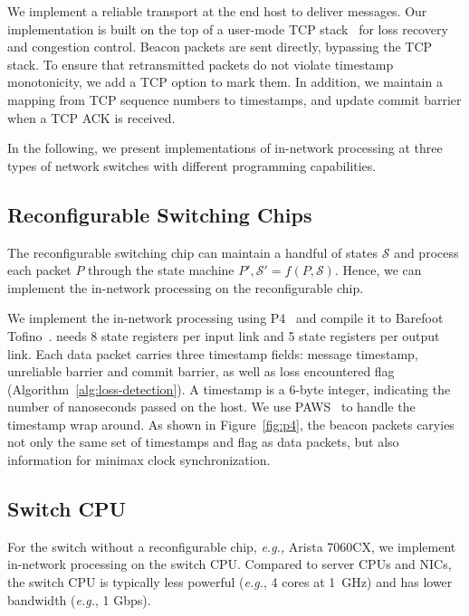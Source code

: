 We implement a reliable transport at the end host to deliver messages. Our implementation is built on the top of a user-mode TCP stack~\cite{dunkels2001design} for loss recovery and congestion control. Beacon packets are sent directly, bypassing the TCP stack. To ensure that retransmitted packets do not violate timestamp monotonicity, we add a TCP option to mark them. In addition, we maintain a mapping from TCP sequence numbers to timestamps, and update commit barrier when a TCP ACK is received.

In the following, we present implementations of in-network processing at three types of network switches with different programming capabilities. 

\subsection{Reconfigurable Switching Chips}
\label{sec:p4}
The reconfigurable switching chip can maintain 
a handful of states $\mathcal{S}$ and process each packet $P$ through the state machine $P', \mathcal{S}' = f(P, \mathcal{S})$. Hence, we can implement the in-network processing on the reconfigurable chip. 

We implement the in-network processing using P4~\cite{bosshart2014p4} and compile it to Barefoot Tofino~\cite{tofino}. \sys needs 8 state registers per input link and 5 state registers per output link. Each data packet carries three timestamp fields: message timestamp, unreliable barrier and commit barrier, as well as loss encountered flag (Algorithm~\ref{alg:loss-detection}).
A timestamp is a 6-byte integer, indicating the number of nanoseconds passed on the host. %
We use PAWS~\cite{jacobson1992tcp} to handle the timestamp wrap around.
As shown in Figure~\ref{fig:p4}, the beacon packets caryies not only the same set of timestamps and flag as data packets, but also information for minimax clock synchronization.

\subsection{Switch CPU}
\label{sec:commodity}

For the switch without a reconfigurable chip, \textit{e.g.,} Arista 7060CX, we implement in-network processing on the switch CPU. 
Compared to server CPUs and NICs, the switch CPU is typically less powerful (\textit{e.g.}, 4 cores at 1~GHz) and has lower bandwidth (\textit{e.g.}, 1 Gbps).

